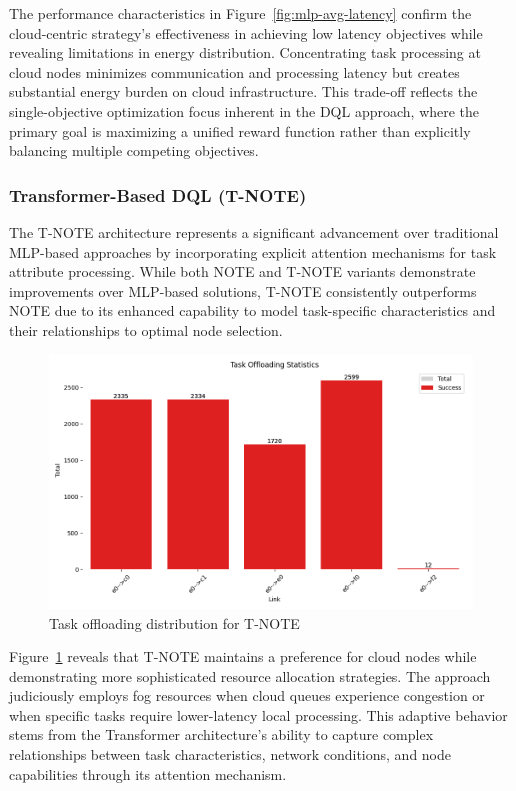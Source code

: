 \documentclass[preprint,3p,authoryear]{elsarticle}
\begin{document}
The performance characteristics in Figure~\ref{fig:mlp-avg-latency} confirm the cloud-centric strategy's effectiveness in achieving low latency objectives while revealing limitations in energy distribution. Concentrating task processing at cloud nodes minimizes communication and processing latency but creates substantial energy burden on cloud infrastructure. This trade-off reflects the single-objective optimization focus inherent in the DQL approach, where the primary goal is maximizing a unified reward function rather than explicitly balancing multiple competing objectives.


\subsubsection{Transformer-Based DQL (T-NOTE)}\label{subsubsec:T-NOTE-analysis}

The T-NOTE architecture represents a significant advancement over traditional MLP-based approaches by incorporating explicit attention mechanisms for task attribute processing. While both NOTE and T-NOTE variants demonstrate improvements over MLP-based solutions, T-NOTE consistently outperforms NOTE due to its enhanced capability to model task-specific characteristics and their relationships to optimal node selection.

\begin{figure}[H]
    \centering
    \includegraphics[width=0.5\linewidth]{figs/T-NOTE/task_offloading_statistics.png}
    \caption{Task offloading distribution for T-NOTE}
    \label{fig:T-NOTE-offloading-stats}
\end{figure}

Figure~\ref{fig:T-NOTE-offloading-stats} reveals that T-NOTE maintains a preference for cloud nodes while demonstrating more sophisticated resource allocation strategies. The approach judiciously employs fog resources when cloud queues experience congestion or when specific tasks require lower-latency local processing. This adaptive behavior stems from the Transformer architecture's ability to capture complex relationships between task characteristics, network conditions, and node capabilities through its attention mechanism.
\end{document}
